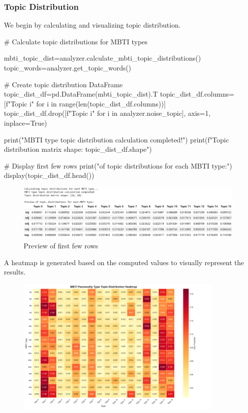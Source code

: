 \documentclass[12pt]{article}
\begin{document}
	\subsubsection{Topic Distribution}
	We begin by calculating and visualizing topic distribution.
	\begin{python}
# Calculate topic distributions for MBTI types

mbti_topic_dist=analyzer.calculate_mbti_topic_distributions()
topic_words=analyzer.get_topic_words()

# Create topic distribution DataFrame
topic_dist_df=pd.DataFrame(mbti_topic_dist).T
topic_dist_df.columns=[f"Topic {i}" for i in range(len(topic_dist_df.columns))]
topic_dist_df.drop([f"Topic {i}" for i in analyzer.noise_topic],
                   axis=1,
                   inplace=True)

print("MBTI type topic distribution calculation completed!")
print(f"Topic distribution matrix shape: {topic_dist_df.shape}")

# Display first few rows
print("\nPreview of topic distributions for each MBTI type:")
display(topic_dist_df.head())
	\end{python}
	\begin{figure}[H]
		\centering
		\includegraphics[width=1\textwidth]{Q2row} 
		\caption{\centering Preview of first few rows}		
	\end{figure}
	
	A heatmap is generated based on the computed values to visually represent the results.
	\begin{figure}[H]
		\centering
		\includegraphics[width=0.9\textwidth]{Q2hmap} 	
	\end{figure}
	
\end{document}
